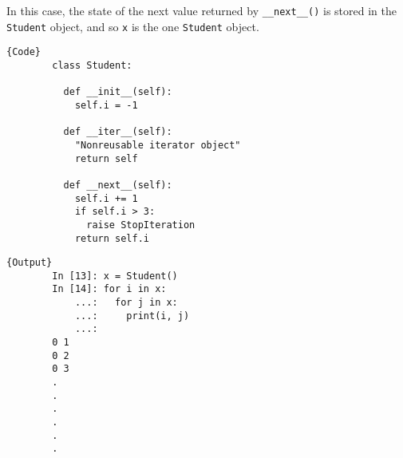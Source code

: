   \begin{theorem}
    In this case, the state of the next value returned by \texttt{\_\_next\_\_()} is stored in the \texttt{Student} object, and so \texttt{x} is the one \texttt{Student} object. 

    \noindent\begin{minipage}{.5\textwidth}
      \begin{lstlisting}[]{Code}
        class Student: 

          def __init__(self): 
            self.i = -1

          def __iter__(self): 
            "Nonreusable iterator object"
            return self 

          def __next__(self): 
            self.i += 1  
            if self.i > 3: 
              raise StopIteration
            return self.i
      \end{lstlisting}
      \end{minipage}
      \hfill
      \begin{minipage}{.49\textwidth}
      \begin{lstlisting}[]{Output}
        In [13]: x = Student()
        In [14]: for i in x:
            ...:   for j in x:
            ...:     print(i, j)
            ...: 
        0 1
        0 2
        0 3
        .
        .
        .
        .
        .
        .
      \end{lstlisting}
    \end{minipage}
  \end{theorem}


